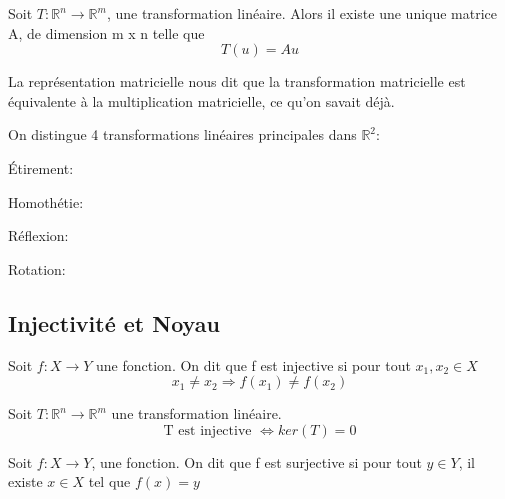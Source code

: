 \documentclass{article}
\begin{document}
\begin{theorem}
    Soit $T: \mathbb{R}^n \rightarrow \mathbb{R}^m$, une transformation
    linéaire. Alors il existe une unique matrice A, de dimension m x n
    telle que $$ T(u)=A u$$
\end{theorem}

\begin{intuition}
    La représentation matricielle nous dit que la transformation matricielle
    est équivalente à la multiplication matricielle, ce qu'on savait déjà.
\end{intuition}

\begin{proposition}
    On distingue 4 transformations linéaires principales dans
    $\mathbb{R}^2$:
    \begin{enumeration}
	\item Étirement:
	\item Homothétie:
	\item Réflexion:
	\item Rotation:
    \end{enumeration}
\end{proposition}

\begin{definition}
\end{definition}

\subsection{Injectivité et Noyau}

\begin{definition}[Injectivité]
    Soit $f:X \rightarrow Y$ une fonction. On dit que f est injective si
    pour tout $x_1, x_2 \in X$ $$ x_1 \neq x_2 \Longrightarrow f(x_1)
    \neq f(x_2)$$
\end{definition}

\begin{theorem}
    Soit $T: \mathbb{R}^n \rightarrow \mathbb{R}^m$ une transformation
    linéaire. $$ \text{T est injective } \Longleftrightarrow ker(T)={0}$$
\end{theorem}

\begin{definition}[Surjectivité]
    Soit $f:X \rightarrow Y$, une fonction. On dit que f est surjective
    si pour tout $y \in Y$, il existe $x \in X$ tel que $f(x)=y$
\end{definition}
\end{document}
